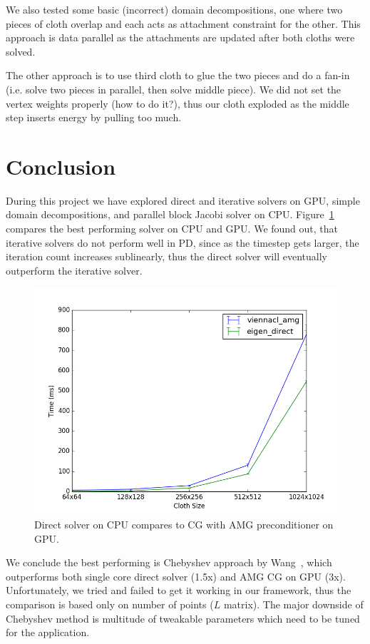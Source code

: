 \documentclass{article}
\begin{document}
We also tested some basic (incorrect) domain decompositions, one where two
pieces of cloth overlap and each acts as attachment constraint for the other.
This approach is data parallel as the attachments are updated after both
cloths were solved.

The other approach is to use third cloth to glue the two pieces and do a
fan-in (i.e. solve two pieces in parallel, then solve middle piece). We did
not set the vertex weights properly (how to do it?), thus our cloth exploded
as the middle step inserts energy by pulling too much.


\section{Conclusion}
During this project we have explored direct and iterative solvers on GPU,
simple domain decompositions, and parallel block Jacobi solver on CPU.
Figure~\ref{fig:amg_direct} compares the best performing solver on CPU and
GPU.
We found out, that iterative solvers do not perform well in PD, since as the
timestep gets larger, the iteration count increases sublinearly, thus the
direct solver will eventually outperform the iterative solver.

\begin{figure}[htb!]
        \centering
        \includegraphics[width=\linewidth]{img/amg_direct.png}
        \caption{Direct solver on CPU compares to CG with AMG preconditioner
                 on GPU.}
        \label{fig:amg_direct}
\end{figure}


We conclude the best performing is Chebyshev approach by Wang~\cite{Wang15},
which outperforms both single core direct solver (1.5x) and AMG CG on GPU (3x).
Unfortunately, we tried and failed to get it working in our framework, thus
the comparison is based only on number of points ($L$ matrix). The major
downside of Chebyshev method is multitude of tweakable parameters which need
to be tuned for the application.


{}

\end{document}
